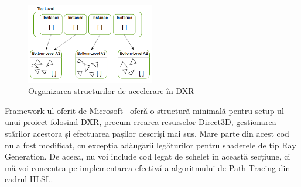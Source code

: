 \documentclass[12pt,a4paper]{report}
\numberwithin{equation}{section} %
\begin{document}
\begin{figure}[!htb]
	\centering
	\includegraphics[width=0.5\textwidth]{pics/AccelerationStructure.png}
	\caption{Organizarea structurilor de accelerare în DXR~\protect\footnotemark}
	\label{fig:blas}
\end{figure}

Framework-ul oferit de Microsoft~\cite{Schelet} oferă o structură minimală pentru
setup-ul unui proiect folosind DXR, precum crearea resurselor Direct3D, gestionarea
stărilor acestora și efectuarea pașilor descriși mai sus. Mare parte din acest
cod nu a fost modificat, cu excepția adăugării legăturilor pentru shaderele de
tip Ray Generation. De aceea, nu voi include cod legat de schelet în această secțiune,
ci mă voi concentra pe implementarea efectivă a algoritmului de Path Tracing din
cadrul HLSL.
\end{document}
